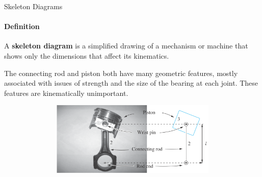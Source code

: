 \documentclass[aspectratio=169]{beamer}
\begin{document}
\begin{frame}[t]{Skeleton Diagrams}
\framesubtitle{Definition}
\vspace{-0.3cm}
A \textbf{skeleton diagram} is a simplified drawing of a mechanism or machine that shows only
the dimensions that affect its kinematics.

The connecting rod and piston both
have many geometric features, mostly associated with issues of strength and the size of
the bearing at each joint. These features are kinematically unimportant.
\vspace{-0.5cm}

\begin{figure}[H]
    \centering\includegraphics[height=3.5cm,width=1\textwidth,keepaspectratio]{skeleton_diagram.png}
    \label{fig:skeleton_diagram.png}
\end{figure}
\end{frame}
\end{document}
